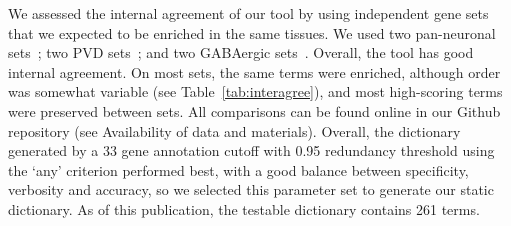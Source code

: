 \documentclass{bmcart}
\begin{document}
We assessed the internal agreement of our tool by using independent gene sets that we expected to be enriched in the same tissues. We used two  pan-neuronal sets~\cite{Spencer2011, Watson2008a}; two PVD sets~\cite{Spencer2011, Smith2010}; and two  GABAergic sets~\cite{Spencer2011, Cinar2005}.%
Overall, the tool has good internal agreement. On most sets, the same terms were enriched, although order was somewhat variable (see Table~\ref{tab:interagree}), and most high-scoring terms were preserved between sets. %
All comparisons can be found online in our Github repository (see Availability of data and materials). Overall, the dictionary generated by a 33 gene annotation cutoff with 0.95 redundancy threshold using the `any' criterion performed best, with a good balance between specificity, verbosity and accuracy, so we selected this parameter set to generate our static dictionary. As of this publication, the testable dictionary contains 261 terms. 
\end{document}
